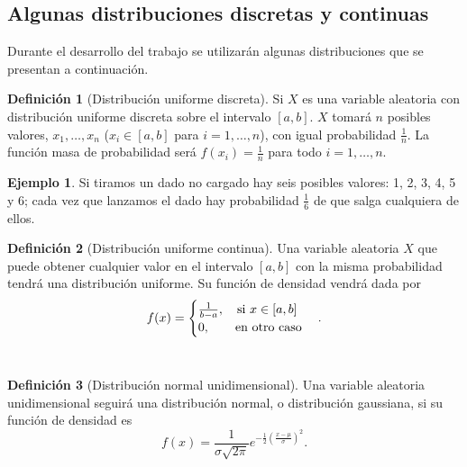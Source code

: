 \documentclass[12pt,a4paper]{report} %
\theoremstyle{definition}
\newtheorem{definition}{Definición}[section]
\newtheorem{example}[theorem]{Ejemplo}
\begin{document}
\subsection{Algunas distribuciones discretas y continuas}

Durante el desarrollo del trabajo se utilizarán algunas distribuciones que se presentan a continuación.\\
\begin{definition}[Distribución uniforme discreta]
Si $X$ es una variable aleatoria con distribución uniforme discreta sobre el intervalo $[a,b]$. $X$ tomará $n$ posibles valores, $x_1,\dots,x_n$ ($x_i\in [a,b]$ para $i=1,\dots,n$), con igual probabilidad $\frac{1}{n}$. La función masa de probabilidad será $f(x_i) = \frac{1}{n}$ para todo $i = 1,\dots, n$. \\
\end{definition}

\begin{example}
  Si tiramos un dado no cargado hay seis posibles valores: 1, 2, 3, 4, 5 y 6; cada vez que lanzamos el dado hay probabilidad $\frac{1}{6}$ de que salga cualquiera de ellos.\\
\end{example}

\begin{definition}[Distribución uniforme continua]
  Una variable aleatoria $X$ que puede obtener cualquier valor en el intervalo $[a,b]$ con la misma probabilidad tendrá una distribución uniforme. Su función de densidad vendrá dada por \[
f(x) = 
\begin{cases}
  \frac{1}{b-a},\quad \text{si } x\in [a,b]\\
  0,\quad\quad \text{en otro caso}
\end{cases}.\\
  \]\\[-10pt]
\end{definition}

\begin{definition}[Distribución normal unidimensional]
  Una variable aleatoria unidimensional seguirá una distribución normal, o distribución gaussiana, si su función de densidad es \[
f(x) = \frac{1}{\sigma\sqrt{2\pi}}e^{-\frac{1}{2}\left( \frac{x-\mu}{\sigma}\right ) ^2}.
\]\\[-10pt]
\end{definition}
\end{document}
